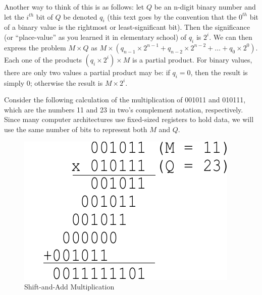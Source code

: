 \documentclass{article}
\begin{document}

Another way to think of this is as follows: let $Q$ be an n-digit binary number and let the $i^{th}$ bit of $Q$ be denoted $q_i$ (this text goes by the convention that the $0^{th}$ bit of a binary value is the rightmost or least-significant bit).
Then the significance (or ``place-value'' as you learned it in elementary school) of $q_i$ is $2^i$.
We can then express the problem $M \times Q$ as $M \times (q_{n-1} \times 2^{n-1} + q_{n-2} \times 2^{n-2} + \ldots + q_{0} \times 2^{0})$.
Each one of the products $(q_i \times 2^{i}) \times M$ is a partial product.
For binary values, there are only two values a partial product may be: if $q_i = 0$, then the result is simply $0$; otherwise the result is $M \times 2^i$.

\pagebreak

Consider the following calculation of the multiplication of 001011 and 010111, which are the numbers 11 and 23 in two's complement notation, respectively.
Since many computer architectures use fixed-sized registers to hold data, we will use the same number of bits to represent both $M$ and $Q$.

\begin{figure}[h]
\centering
\includegraphics[scale=0.7]{saam3.pdf}
\caption{Shift-and-Add Multiplication}
\end{figure}
\end{document}
